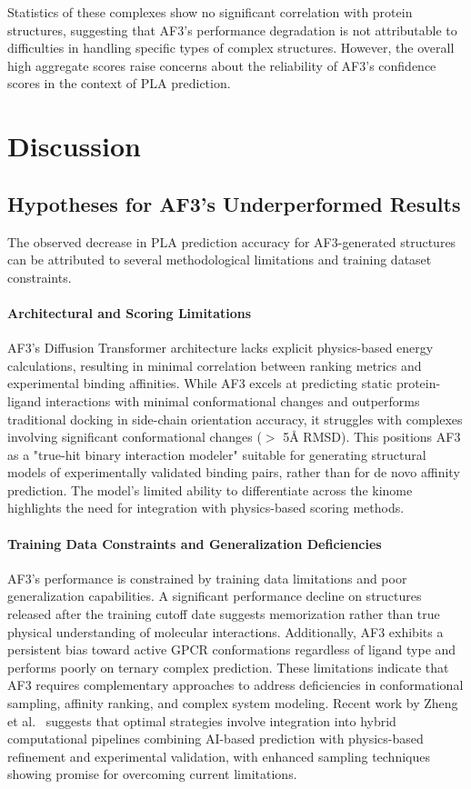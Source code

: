 \documentclass[unnumsec,webpdf,contemporary,large]{oup-authoring-template}
\theoremstyle{thmstyleone}%
\theoremstyle{thmstyletwo}%
\theoremstyle{thmstylethree}%
\begin{document}
Statistics of these complexes show no significant correlation with protein structures,
suggesting that AF3's performance degradation is not attributable to difficulties 
in handling specific types of complex structures. However, the
overall high aggregate scores raise concerns about the reliability of
AF3's confidence scores in the context of PLA prediction. 

\section{Discussion}
\subsection{Hypotheses for AF3's Underperformed Results}
The observed decrease in PLA prediction accuracy for AF3-generated structures 
can be attributed to several methodological limitations and training dataset constraints.


\paragraph{\textbf{Architectural and Scoring Limitations}}

AF3's Diffusion Transformer architecture lacks explicit physics-based energy 
calculations, resulting in minimal correlation between ranking metrics 
and experimental binding affinities. While AF3 excels at predicting 
static protein-ligand interactions with minimal conformational changes 
and outperforms traditional docking in side-chain orientation accuracy, it 
struggles with complexes involving significant conformational changes 
($>$ 5Å RMSD). This positions AF3 as a "true-hit binary interaction modeler" 
suitable for generating structural models of experimentally validated binding pairs, 
rather than for de novo affinity prediction. The model's limited ability 
to differentiate across the kinome highlights the need for integration 
with physics-based scoring methods.


\paragraph{\textbf{Training Data Constraints and Generalization Deficiencies}}

AF3's performance is constrained by training data limitations and poor generalization 
capabilities. A significant performance decline on structures released after 
the training cutoff date suggests memorization rather than true physical 
understanding of molecular interactions. Additionally, AF3 exhibits a 
persistent bias toward active GPCR conformations regardless of ligand type 
and performs poorly on ternary complex prediction. These limitations 
indicate that AF3 requires complementary approaches to address deficiencies 
in conformational sampling, affinity ranking, and complex system modeling. 
Recent work by Zheng et al.~\cite{Zheng2025.04.07.647682} suggests that optimal 
strategies involve integration into hybrid computational pipelines combining 
AI-based prediction with physics-based refinement and experimental validation, 
with enhanced sampling techniques showing promise for overcoming current limitations.
\end{document}
